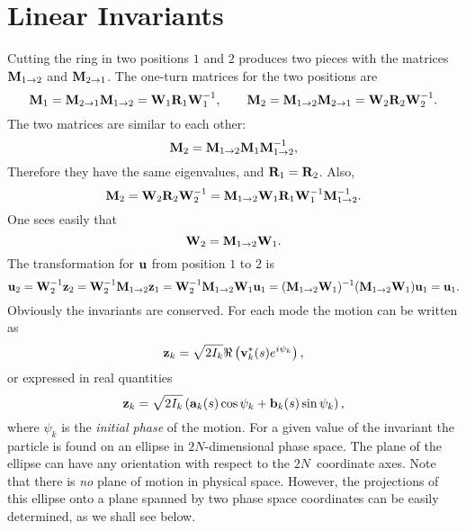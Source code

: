 \section{Linear Invariants}
Cutting the ring in two positions $1$ and $2$ produces two pieces with
the matrices $\bold{M}_{1 \rightarrow 2}$ and $\bold{M}_{2 \rightarrow 1}$.
The one-turn matrices for the two positions are
\begin{equation}
\bold{M}_1 = \bold{M}_{2 \rightarrow 1} \bold{M}_{1 \rightarrow 2} = 
\bold{W}_1 \bold{R}_1 \bold{W}_1^{-1}, \qquad
\bold{M}_2 = \bold{M}_{1 \rightarrow 2} \bold{M}_{2 \rightarrow 1} =
\bold{W}_2 \bold{R}_2 \bold{W}_2^{-1}.
\end{equation}
The two matrices are similar to each other:
\begin{equation}
\bold{M}_2 = \bold{M}_{1 \rightarrow 2} \bold{M}_1 \bold{M}_{1 \rightarrow
2}^{-1},
\end{equation}
Therefore they have the same eigenvalues, and $\bold{R}_1 = \bold{R}_2$.
Also,
\begin{equation}
\bold{M}_2 = \bold{W}_2 \bold{R}_2 \bold{W}_2^{-1} =
\bold{M}_{1\rightarrow 2} \bold{W}_1 \bold{R}_1 \bold{W}_1^{-1}
\bold{M}_{1 \rightarrow 2}^{-1}.
\end{equation}
One sees easily that
\begin{equation}
\bold{W}_2 = \bold{M}_{1 \rightarrow 2} \bold{W}_1.
\end{equation}
The transformation for $\bold{u}$ from position $1$ to $2$ is
\begin{equation}
\bold{u}_2 = \bold{W}_2^{-1} \bold{z}_2 =
\bold{W}_2^{-1} \bold{M}_{1 \rightarrow 2} \bold{z}_1 =
\bold{W}_2^{-1} \bold{M}_{1 \rightarrow 2} \bold{W}_1 \bold{u}_1 =
(\bold{M}_{1 \rightarrow 2}\bold{W}_1)^{-1}
(\bold{M}_{1 \rightarrow 2}\bold{W}_1)\bold{u}_1 = \bold{u}_1.
\end{equation}
Obviously the invariants are conserved.
For each mode the motion can be written as
\begin{equation}
\bold{z}_k = \sqrt{2 I_k} \Re \left( \bold{v}_k^*(s) e^{i \psi_k} \right),
\end{equation}
or expressed in real quantities
\begin{equation}
\bold{z}_k = \sqrt{2 I_k} \left(
        \bold{a}_k(s) \cos\psi_k +
        \bold{b}_k(s) \sin\psi_k
\right),
\end{equation}
where $\psi_k$ is the {\em initial phase} of the motion.
For a given value of the invariant the particle is found on an ellipse in
$2N$-dimensional phase space.
The plane of the ellipse can have any orientation with respect to the
$2N$~coordinate axes.
Note that there is {\em no} plane of motion in physical space.
However, the projections of this ellipse onto a plane spanned by two
phase space coordinates can be easily determined,
as we shall see below. 
 
